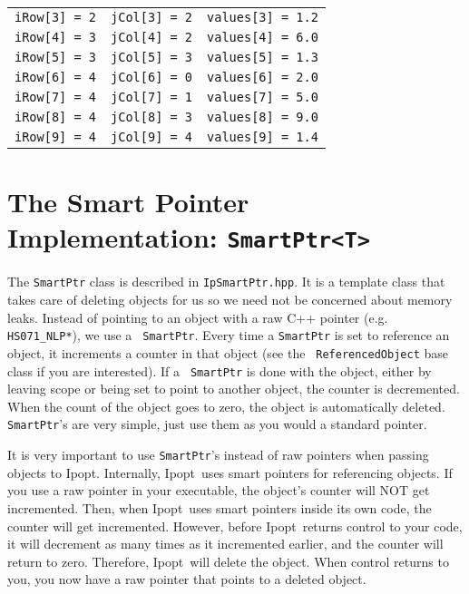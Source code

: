 \documentclass[10pt]{article}
\newcommand{\Ipopt}{{\sc Ipopt}}
\begin{document}
\begin{footnotesize}
\begin{table}[ht]
\begin{center}
\begin{tabular}{c c c}
{\tt iRow[3] = 2}       &       {\tt jCol[3] = 2}       & {\tt values[3] = 1.2}     \\
{\tt iRow[4] = 3}       &       {\tt jCol[4] = 2}       & {\tt values[4] = 6.0}     \\
{\tt iRow[5] = 3}       &       {\tt jCol[5] = 3}       & {\tt values[5] = 1.3}     \\
{\tt iRow[6] = 4}       &       {\tt jCol[6] = 0}       & {\tt values[6] = 2.0}     \\
{\tt iRow[7] = 4}       &       {\tt jCol[7] = 1}       & {\tt values[7] = 5.0}     \\
{\tt iRow[8] = 4}       &       {\tt jCol[8] = 3}       & {\tt values[8] = 9.0}     \\
{\tt iRow[9] = 4}       &       {\tt jCol[9] = 4}       & {\tt values[9] = 1.4}
\end{tabular}
\end{center}
\end{table}
\end{footnotesize}
\newpage
\section{The Smart Pointer Implementation: {\tt SmartPtr<T>}} \label{app.smart_ptr}

The {\tt SmartPtr} class is described in {\tt IpSmartPtr.hpp}. It is a
template class that takes care of deleting objects for us so we need
not be concerned about memory leaks. Instead of pointing to an object
with a raw C++ pointer (e.g. {\tt HS071\_NLP*}), we use a {\tt
  SmartPtr}.  Every time a {\tt SmartPtr} is set to reference an
object, it increments a counter in that object (see the {\tt
  ReferencedObject} base class if you are interested). If a {\tt
  SmartPtr} is done with the object, either by leaving scope or being
set to point to another object, the counter is decremented. When the
count of the object goes to zero, the object is automatically deleted.
{\tt SmartPtr}'s are very simple, just use them as you would a
standard pointer.

It is very important to use {\tt SmartPtr}'s instead of raw pointers
when passing objects to \Ipopt. Internally, \Ipopt\ uses smart
pointers for referencing objects. If you use a raw pointer in your
executable, the object's counter will NOT get incremented. Then, when
\Ipopt\ uses smart pointers inside its own code, the counter will get
incremented. However, before \Ipopt\ returns control to your code, it
will decrement as many times as it incremented earlier, and the
counter will return to zero. Therefore, \Ipopt\ will delete the
object. When control returns to you, you now have a raw pointer that
points to a deleted object.
\end{document}
